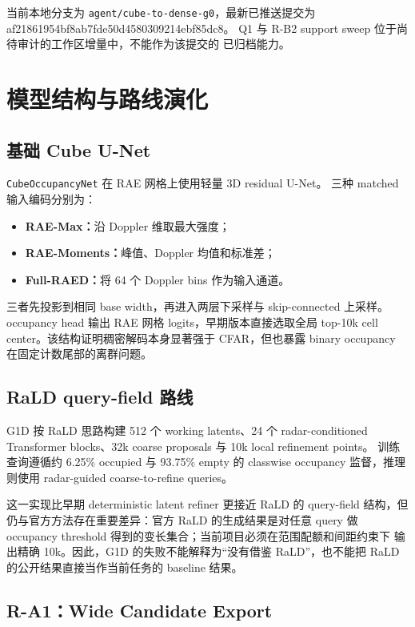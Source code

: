 \documentclass[11pt,a4paper,fontset=none]{ctexart}
\newcommand{\code}[1]{\texttt{#1}}
\newcommand{\hash}[2]{{\small\ttfamily #1\allowbreak{}#2}}
\begin{document}
当前本地分支为 \code{agent/cube-to-dense-g0}，最新已推送提交为
\hash{af21861954bf8ab7fde50d}{4580309214ebf85dc8}。
Q1 与 R-B2 support sweep 位于尚待审计的工作区增量中，不能作为该提交的
已归档能力。

\section{模型结构与路线演化}

\subsection{基础 Cube U-Net}

\code{CubeOccupancyNet} 在 RAE 网格上使用轻量 3D residual U-Net。
三种 matched 输入编码分别为：
\begin{itemize}
  \item \textbf{RAE-Max：}沿 Doppler 维取最大强度；
  \item \textbf{RAE-Moments：}峰值、Doppler 均值和标准差；
  \item \textbf{Full-RAED：}将 64 个 Doppler bins 作为输入通道。
\end{itemize}
三者先投影到相同 base width，再进入两层下采样与 skip-connected 上采样。
occupancy head 输出 RAE 网格 logits，早期版本直接选取全局 top-10k cell
center。该结构证明稠密解码本身显著强于 CFAR，但也暴露 binary occupancy
在固定计数尾部的离群问题。

\subsection{RaLD query-field 路线}

G1D 按 RaLD 思路构建 512 个 working latents、24 个 radar-conditioned
Transformer blocks、32k coarse proposals 与 10k local refinement points。
训练查询遵循约 6.25\% occupied 与 93.75\% empty 的 classwise occupancy
监督，推理则使用 radar-guided coarse-to-refine queries。

这一实现比早期 deterministic latent refiner 更接近 RaLD 的 query-field
结构，但仍与官方方法存在重要差异：官方 RaLD 的生成结果是对任意 query
做 occupancy threshold 得到的变长集合；当前项目必须在范围配额和间距约束下
输出精确 10k。因此，G1D 的失败不能解释为“没有借鉴 RaLD”，也不能把
RaLD 的公开结果直接当作当前任务的 baseline 结果。

\subsection{R-A1：Wide Candidate Export}
\end{document}
